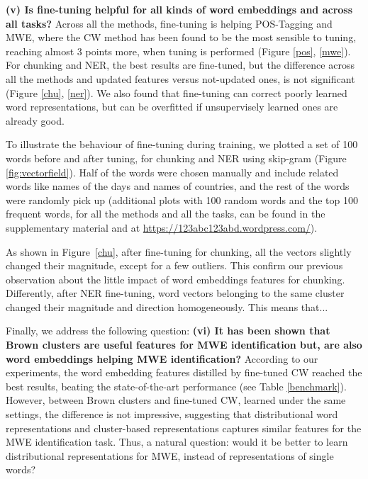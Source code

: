\textbf{(v) Is fine-tuning helpful for all kinds of word embeddings and across all tasks?}
Across all the methods, fine-tuning is helping POS-Tagging and MWE, where the CW method has been found to be the most sensible to tuning, reaching almost 3 points more, when tuning is performed (Figure \ref{pos}, \ref{mwe}). 
For chunking and NER, the best results are fine-tuned, but the difference across all the methods and updated features versus not-updated ones, is not significant (Figure \ref{chu}, \ref{ner}). 
We also found that fine-tuning can correct poorly learned word representations, but can be
overfitted if unsupervisely learned ones are already good. 

To illustrate the behaviour of fine-tuning during training, we plotted a set of 100 words before and after tuning, for chunking and NER using skip-gram (Figure \ref{fig:vectorfield}). 
Half of the words were chosen manually and include related words like names of the days and names of countries, and the rest of the words were randomly pick up (additional plots with 100 random words and the top 100 frequent words, for all the methods and all the tasks, can be found in the supplementary material and at \url{https://123abc123abd.wordpress.com/}).

As shown in Figure~\ref{chu}, after fine-tuning for chunking, all the vectors slightly changed their magnitude, except for a few outliers. This confirm our previous observation about the little impact of word embeddings features for chunking. 
Differently, after NER fine-tuning, word vectors belonging to the same cluster changed their magnitude and direction homogeneously. {\color{red} This means that...}

Finally, we address the following question: \textbf{(vi) It has been shown that Brown clusters are useful features for MWE identification but, are also word embeddings helping MWE identification?} 
According to our experiments, the word embedding features distilled by fine-tuned CW reached the best results, beating the state-of-the-art performance (see Table \ref{benchmark}).
However, between Brown clusters and fine-tuned CW, learned under the same settings, the difference is not impressive, suggesting that distributional word representations and cluster-based representations captures similar features for the MWE identification task.
Thus, a natural question: would it be better to learn distributional representations for MWE, instead of representations of single words?


